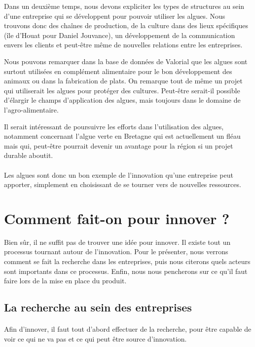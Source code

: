 \documentclass[a4paper,12pt]{report}
\begin{document}
			Dans un deuxième temps, nous devons expliciter les types de structures au sein d’une entreprise qui se développent pour pouvoir utiliser les algues. Nous trouvons donc des chaînes de production, de la culture dans des lieux spécifiques (île d’Houat pour Daniel Jouvance)\cite{Algues}, un développement de la communication envers les clients et peut-être même de nouvelles relations entre les entreprises.
			
			Nous pouvons remarquer dans la base de données de Valorial que les algues sont surtout utilisées en complément alimentaire pour le bon développement des animaux ou dans la fabrication de plats. On remarque tout de même un projet qui utiliserait les algues pour protéger des cultures. Peut-être serait-il possible d’élargir le champs d’application des algues, mais toujours dans le domaine de l’agro-alimentaire. 
			
			Il serait intéressant de poursuivre les efforts dans l’utilisation des algues, notamment concernant l’algue verte en Bretagne qui est actuellement un fléau mais qui, peut-être pourrait devenir un avantage pour la région si un projet durable aboutit. 
			
		\paragraph{}Les algues sont donc un bon exemple de l'innovation qu'une entreprise peut apporter, simplement en choisissant de se tourner vers de nouvelles ressources.
			
	\section{Comment fait-on pour innover ?}
		Bien sûr, il ne suffit pas de trouver une idée pour innover. Il existe tout un processus tournant autour de l'innovation. Pour le présenter, nous verrons comment se fait la recherche dans les entreprises, puis nous citerons quels acteurs sont importants dans ce processus. Enfin, nous nous pencherons sur ce qu'il faut faire lors de la mise en place du produit.
			
		\subsection{La recherche au sein des entreprises}
			\paragraph{}Afin d'innover, il faut tout d'abord effectuer de la recherche, pour être capable de voir ce qui ne va pas et ce qui peut être source d'innovation.		
		
\end{document}

